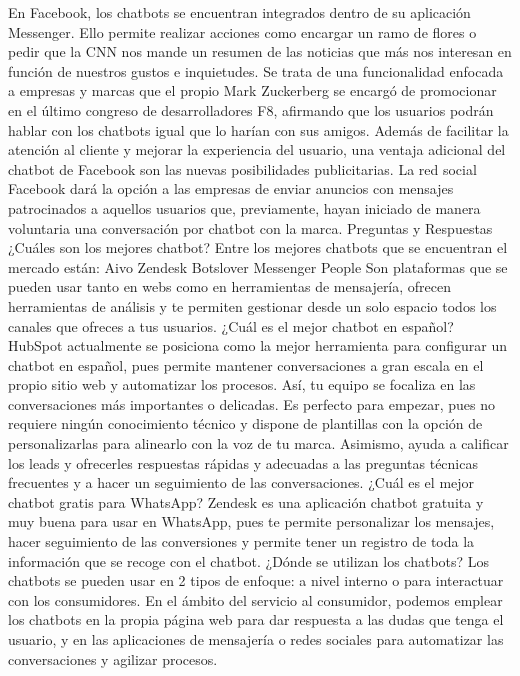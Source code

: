 En Facebook, los chatbots se encuentran integrados dentro de su aplicación Messenger. Ello permite realizar acciones como encargar un ramo de flores o pedir que la CNN nos mande un resumen de las noticias que más nos interesan en función de nuestros gustos e inquietudes.
Se trata de una funcionalidad enfocada a empresas y marcas que el propio Mark Zuckerberg se encargó de promocionar en el último congreso de desarrolladores F8, afirmando que los usuarios podrán hablar con los chatbots igual que lo harían con sus amigos.  
Además de facilitar la atención al cliente y mejorar la experiencia del usuario, una ventaja adicional del chatbot de Facebook son las nuevas posibilidades publicitarias. La red social Facebook dará la opción a las empresas de enviar anuncios con mensajes patrocinados a aquellos usuarios que, previamente, hayan iniciado de manera voluntaria una conversación por chatbot con la marca.
Preguntas y Respuestas
¿Cuáles son los mejores chatbot?
Entre los mejores chatbots que se encuentran el mercado están:
Aivo
Zendesk
Botslover
Messenger People
Son plataformas que se pueden usar tanto en webs como en herramientas de mensajería, ofrecen herramientas de análisis y te permiten gestionar desde un solo espacio todos los canales que ofreces a tus usuarios.
¿Cuál es el mejor chatbot en español?
HubSpot actualmente se posiciona como la mejor herramienta para configurar un chatbot en español, pues permite mantener conversaciones a gran escala en el propio sitio web y automatizar los procesos. Así, tu equipo se focaliza en las conversaciones más importantes o delicadas. Es perfecto para empezar, pues no requiere ningún conocimiento técnico y dispone de plantillas con la opción de personalizarlas para alinearlo con la voz de tu marca. Asimismo, ayuda a calificar los leads y ofrecerles respuestas rápidas y adecuadas a las preguntas técnicas frecuentes y a hacer un seguimiento de las conversaciones.
¿Cuál es el mejor chatbot gratis para WhatsApp?
Zendesk es una aplicación chatbot gratuita y muy buena para usar en WhatsApp, pues te permite personalizar los mensajes, hacer seguimiento de las conversiones y permite tener un registro de toda la información que se recoge con el chatbot.
¿Dónde se utilizan los chatbots?
Los chatbots se pueden usar en 2 tipos de enfoque: a nivel interno o para interactuar con los consumidores.
En el ámbito del servicio al consumidor, podemos emplear los chatbots en la propia página web para dar respuesta a las dudas que tenga el usuario, y en las aplicaciones de mensajería o redes sociales para automatizar las conversaciones y agilizar procesos.
